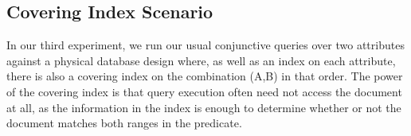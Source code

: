 


%
%

\vspace*{-0.5\baselineskip}
\subsection{Covering Index Scenario}
In our third experiment, we run our usual conjunctive queries over two attributes against a physical database design where, as well as an index on each attribute, there is also a covering index on the combination (A,B) in that order. The power of the covering index is that query execution often need not access the document at all, as the information in the index is enough to determine whether or not the document matches both ranges in the predicate. 


